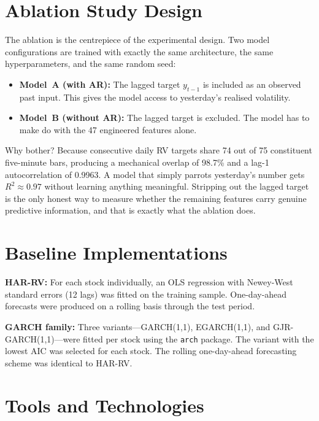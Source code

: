 \section{Ablation Study Design}

The ablation is the centrepiece of the experimental design. Two model configurations are trained with exactly the same architecture, the same hyperparameters, and the same random seed:

\begin{itemize}
\item \textbf{Model~A (with AR):} The lagged target $y_{t-1}$ is included as an observed past input. This gives the model access to yesterday's realised volatility.
\item \textbf{Model~B (without AR):} The lagged target is excluded. The model has to make do with the 47 engineered features alone.
\end{itemize}

Why bother? Because consecutive daily RV targets share 74 out of 75 constituent five-minute bars, producing a mechanical overlap of 98.7\% and a lag-1 autocorrelation of 0.9963. A model that simply parrots yesterday's number gets $R^2 \approx 0.97$ without learning anything meaningful. Stripping out the lagged target is the only honest way to measure whether the remaining features carry genuine predictive information, and that is exactly what the ablation does.

\section{Baseline Implementations}

\textbf{HAR-RV:} For each stock individually, an OLS regression with Newey-West standard errors (12 lags) was fitted on the training sample. One-day-ahead forecasts were produced on a rolling basis through the test period.

\textbf{GARCH family:} Three variants---GARCH(1,1), EGARCH(1,1), and GJR-GARCH(1,1)---were fitted per stock using the \texttt{arch} package. The variant with the lowest AIC was selected for each stock. The rolling one-day-ahead forecasting scheme was identical to HAR-RV.

\section{Tools and Technologies}

